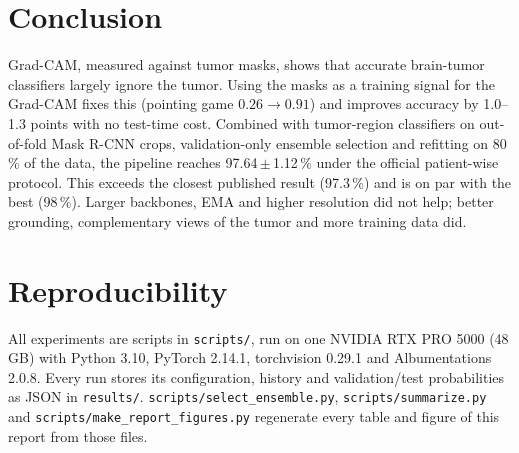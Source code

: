 \documentclass[11pt,a4paper]{article}
\newcommand{\pmstd}[2]{#1\,{\scriptsize$\pm$\,#2}}
\begin{document}
\section{Conclusion}
Grad-CAM, measured against tumor masks, shows that accurate brain-tumor classifiers largely ignore the tumor. Using the
masks as a training signal for the Grad-CAM fixes this (pointing game $0.26\rightarrow0.91$) and improves accuracy by
1.0--1.3 points with no test-time cost. Combined with tumor-region classifiers on out-of-fold Mask R-CNN crops,
validation-only ensemble selection and refitting on 80\,\% of the data, the pipeline reaches
\pmstd{97.64}{1.12}\,\% under the official patient-wise protocol. This exceeds the closest published result (97.3\,\%)
and is on par with the best (98\,\%). Larger backbones, EMA and higher resolution did not help; better grounding,
complementary views of the tumor and more training data did.

\section*{Reproducibility}
All experiments are scripts in \texttt{scripts/}, run on one NVIDIA RTX PRO 5000 (48\,GB) with Python 3.10, PyTorch
2.14.1, torchvision 0.29.1 and Albumentations 2.0.8. Every run stores its configuration, history and validation/test
probabilities as JSON in \texttt{results/}. \texttt{scripts/select\_ensemble.py}, \texttt{scripts/summarize.py} and
\texttt{scripts/make\_report\_figures.py} regenerate every table and figure of this report from those files.
\end{document}

